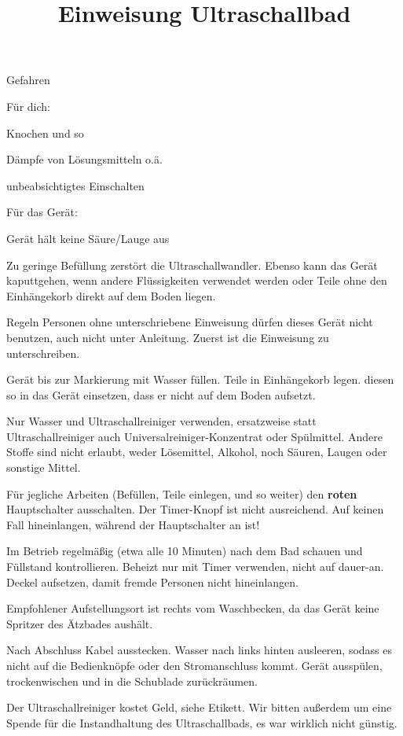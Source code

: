 \documentclass{\basedir/fablab-document}
\title{Einweisung Ultraschallbad}
\begin{document}
	\maketitle
	
\begin{section}{Gefahren}

Für dich:

 Knochen und so

Dämpfe von Lösungsmitteln o.ä.

unbeabsichtigtes Einschalten


Für das Gerät:

Gerät hält keine Säure/Lauge aus

Zu geringe Befüllung zerstört die Ultraschallwandler. Ebenso kann das Gerät kaputtgehen, wenn andere Flüssigkeiten verwendet werden oder Teile ohne den Einhängekorb direkt auf dem Boden liegen.

\end{section}


\begin{section}{Regeln}
Personen ohne unterschriebene Einweisung dürfen dieses Gerät nicht benutzen, auch nicht unter Anleitung. Zuerst ist die Einweisung zu unterschreiben.

Gerät bis zur Markierung mit Wasser füllen. Teile in Einhängekorb legen. diesen so in das Gerät einsetzen, dass er nicht auf dem Boden aufsetzt.

Nur Wasser und Ultraschallreiniger verwenden, ersatzweise statt Ultraschallreiniger auch Universalreiniger-Konzentrat oder Spülmittel. Andere Stoffe sind nicht erlaubt, weder Lösemittel, Alkohol, noch Säuren, Laugen oder sonstige Mittel.

Für jegliche Arbeiten (Befüllen, Teile einlegen, und so weiter) den \textbf{roten} Hauptschalter ausschalten. Der Timer-Knopf ist nicht ausreichend. Auf keinen Fall hineinlangen, während der Hauptschalter an ist!

Im Betrieb regelmäßig (etwa alle 10 Minuten) nach dem Bad schauen und Füllstand kontrollieren. Beheizt nur mit Timer verwenden, nicht auf dauer-an. Deckel aufsetzen, damit fremde Personen nicht hineinlangen.

Empfohlener Aufstellungsort ist rechts vom Waschbecken, da das Gerät keine Spritzer des Ätzbades aushält.

Nach Abschluss Kabel ausstecken. Wasser nach links hinten ausleeren, sodass es nicht auf die Bedienknöpfe oder den Stromanschluss kommt. Gerät ausspülen, trockenwischen und in die Schublade zurückräumen.

Der Ultraschallreiniger kostet Geld, siehe Etikett. Wir bitten außerdem um eine Spende für die Instandhaltung des Ultraschallbads, es war wirklich nicht günstig.
\end{section}
\end{document}
